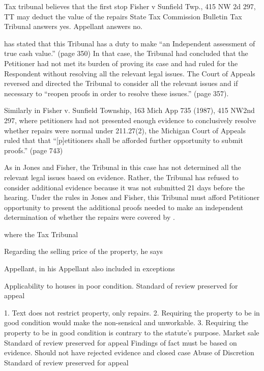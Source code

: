  
Tax tribunal believes that the first stop
Fisher v Sunfield Twp., 415 NW 2d 297, TT may deduct the value of the repairs
State Tax Commission Bulletin
	Tax Tribunal answers yes. Appellant answers no.
 
 
 
has stated that this Tribunal has a duty to make ``an Independent assessment of true cash value.'' (page 350) In that case, the Tribunal had concluded that the Petitioner had not met its burden of proving its case and had ruled for the Respondent without resolving all the relevant legal issues. The Court of Appeals reversed and directed the Tribunal to consider all the relevant issues and if necessary to ``reopen proofs in order to resolve these issues.'' (page 357). 

Similarly in Fisher v. Sunfield Township, 163 Mich App 735 (1987), 415 NW2nd 297, where petitioners had not presented enough evidence to conclusively resolve whether repairs were normal under 211.27(2), the Michigan Court of Appeals ruled that that ``[p]etitioners shall be afforded further opportunity to submit proofs.'' (page 743) 

As in Jones and Fisher, the Tribunal in this case has not determined all the relevant legal issues based on evidence. Rather, the Tribunal has refused to consider additional evidence because it was not submitted 21 days before the hearing. Under the rules in Jones and Fisher, this Tribunal must afford Petitioner opportunity to present the additional proofs needed to make an independent determination of whether the repairs were covered by . 

where the Tax Tribunal 
 
Regarding the selling price of the property, he says 
 
 
Appellant, in his 
Appellant also included in exceptions 
 
 
Applicability to houses in poor condition.
Standard of review
preserved for appeal
 
 
 
 
 
 
1. Text does not restrict property, only repairs.
2. Requiring the property to be in good condition would make the non-sensical and unworkable.
3. Requiring the property to be in good condition is contrary to the statute's purpose.
Market sale
Standard of review
preserved for appeal
Findings of fact must be based on evidence.
Should not have rejected evidence and closed case Abuse of Discretion
Standard of review
preserved for appeal
 
